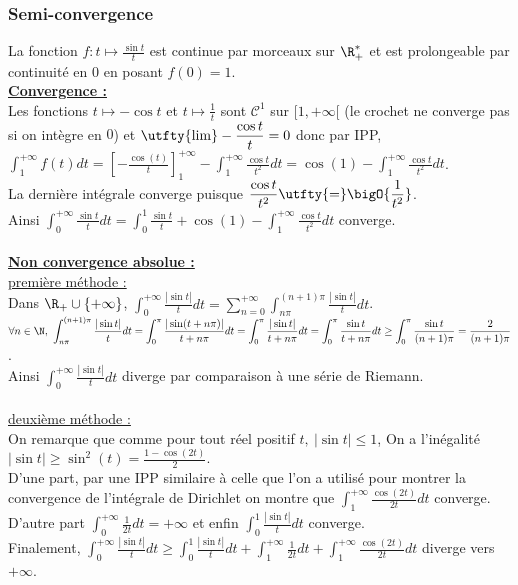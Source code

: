 \documentclass{book}
\begin{document}
	\subsubsection{Semi-convergence }
	La fonction $f:t\mapsto \displaystyle\frac{\sin t}{t}$ est continue par morceaux sur $\R^*_+$ et est prolongeable par continuité en $0$ en posant $f(0)=1$.\\
	\underline{\textbf{Convergence :}}\\
	Les fonctions $t\mapsto -\cos t$ et $t\mapsto \displaystyle\frac{1}{t}$ sont $\mathcal C^1$ sur $[1,+\infty[$ (le crochet ne converge pas si on intègre en $0$) et $\utfty{\lim}\displaystyle-\frac{\cos t}{t}=0$ donc par IPP,\\
	$\displaystyle\int_1^{+\infty}f(t)dt=\left[-\frac{\cos(t)}{t}\right]_1^{+\infty}-\int_1^{+\infty}\frac{\cos t}{t^2}dt=\cos(1)-\int_1^{+\infty}\frac{\cos t}{t^2}dt$.\\
	La dernière intégrale converge puisque $\displaystyle\frac{\cos t}{t^2}\utfty{=}\bigO{\frac{1}{t^2}}$.\\
	Ainsi $\displaystyle\int_0^{+\infty}\frac{\sin t}{t}dt=\int_0^1\frac{\sin t}{t}+\cos(1)-\int_1^{+\infty}\frac{\cos t}{t^2}dt$ converge.\\\\
	\underline{\textbf{Non convergence absolue :}}\\
	\underline{première méthode :}\\
	Dans $\R_+\cup\{+\infty\}$, $\displaystyle\int_0^{+\infty}\frac{|\sin t|}{t}dt=\sum_{n=0}^{+\infty}\int_{n\pi}^{(n+1)\pi}\frac{|\sin t|}{t}dt$.\\
	$\forall n\in \N,\ \displaystyle\int_{n\pi}^{(n+1)\pi}\frac{|\sin t|}{t}dt=\int_0^\pi\frac{|\sin(t+n\pi)|}{t+n\pi}dt=\int_0^\pi\frac{|\sin t|}{t+n\pi}dt=\int_0^\pi\frac{\sin t}{t+n\pi}dt\geq\int_0^\pi\frac{\sin t}{(n+1)\pi}=\frac{2}{(n+1)\pi}$.\\
	Ainsi $\displaystyle\int_0^{+\infty}\frac{|\sin t|}{t}dt$ diverge par comparaison à une série de Riemann.\\\\
	\underline{deuxième méthode :}\\
	On remarque que comme pour tout réel positif $t,\ |\sin t|\leq 1$, On a l'inégalité $|\sin t|\geq \sin^2(t)=\displaystyle\frac{1-\cos(2t)}{2}$.\\
	D'une part, par une IPP similaire à celle que l'on a utilisé pour montrer la convergence de l'intégrale de Dirichlet on montre que $\displaystyle\int_1^{+\infty}\frac{\cos(2t)}{2t}dt$ converge.
	D'autre part $\displaystyle\int_0^{+\infty}\frac{1}{2t}dt=+\infty$ et enfin $\displaystyle\int_0^1\frac{|\sin t|}{t}dt$ converge.\\
	Finalement, $\displaystyle\int_0^{+\infty}\frac{|\sin t|}{t}dt\geq \int_0^1\frac{|\sin t|}{t}dt+\int_1^{+\infty}\frac{1}{2t}dt+\int_1^{+\infty}\frac{\cos(2t)}{2t}dt$ diverge vers $+\infty$.
	
\end{document}
